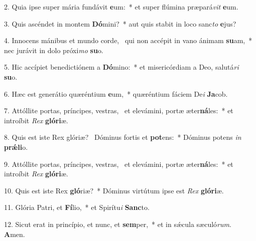 2. Quia ipse super mária fundávit \textbf{e}um:~*  et super flúmina præpará\textit{vit} \textbf{e}um.\

3. Quis ascéndet in montem \textbf{Dó}mini?~*  aut quis stabit in loco sanc\textit{to} \textbf{e}jus?\

4. Innocens mánibus et mundo corde, \dag\  qui non accépit in vano ánimam \textbf{su}am,~*  nec jurávit in dolo próxi\textit{mo} \textbf{su}o.\

5. Hic accípiet benedictiónem a \textbf{Dó}mino:~*  et misericórdiam a Deo, salutá\textit{ri} \textbf{su}o.\

6. Hæc est generátio quæréntium \textbf{e}um,~*  quæréntium fáciem De\textit{i} \textbf{Ja}cob.\

7. Attóllite portas, príncipes, vestras, \dag\  et elevámini, portæ æter\textbf{ná}les:~*  et introíbit \textit{Rex} \textbf{gló}\textbf{ri}æ.\

8. Quis est iste Rex glóriæ? \dag\  Dóminus fortis et \textbf{pot}ens:~*  Dóminus potens \textit{in} \textbf{prǽ}\textbf{li}o.\

9. Attóllite portas, príncipes, vestras, \dag\  et elevámini, portæ æter\textbf{ná}les:~*  et introíbit \textit{Rex} \textbf{gló}\textbf{ri}æ.\

10. Quis est iste Rex \textbf{gló}riæ?~*  Dóminus virtútum ipse est \textit{Rex} \textbf{gló}\textbf{ri}æ.\

11. Glória Patri, et \textbf{Fí}lio,~*  et Spirítu\textit{i} \textbf{Sanc}to.\

12. Sicut erat in princípio, et nunc, et \textbf{sem}per,~*  et in sǽcula sæculó\textit{rum}. \textbf{A}men.\

